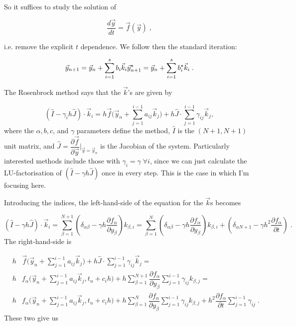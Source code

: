 \documentclass[11pt,a4paper]{article}
\begin{document}
	
	So it suffices to study the solution of
	
	$$
	\dfrac{d\vec{y}}{dt}=\vec{f}(\vec{y}) \;,
	$$
	
	i.e. remove the explicit $t$ dependence. We follow then the standard iteration:
	
	$$
	\vec{y}_{n+1}=\vec{y}_{n}+ \sum_{i=1}^{s} b_i \vec{k}_i \\
	\vec{y}^{\star}_{n+1}=\vec{y}_{n}+ \sum_{i=1}^{s} b_i^{\star} \vec{k}_i \;.
	$$
	
	The Rosenbrock method says that the $\vec{k}$'s are given by
	
	$$
	\left(\hat I - \gamma_i h \hat J \right)\cdot \vec{k}_i =  
	h \vec{f}\Big(\vec{y}_n+\sum_{j=1}^{i-1}a_{ij}\vec{k}_{j} \Big)+
	h \hat J \cdot \sum_{j=1}^{i-1}\gamma_{ij}\vec{k}_{j},
	$$
	where the  $\alpha, b, c$, and $\gamma$ parameters define the method, $\hat I$ is the $(N+1,N+1)$ unit matrix,
	and $\hat J =\dfrac{\partial \vec{f}}{\partial \vec{y}}\Bigg|_{\vec{y}=\vec{y}_n} $ is the Jacobian of the system.
	Particularly interested methods include those with $\gamma_i=\gamma \; \forall i$, since we can just calculate the LU-factorisation 
	of $\left(\hat I - \gamma h \hat J \right)$ once in every step. This is the case in which I'm focusing here.
	
	
	Introducing the indices, the left-hand-side of the equation for the $\vec{k}$s becomes
	
	$$
	\left(\hat I - \gamma h \hat J \right)\cdot \vec{k}_i =  
	\sum_{\beta=1}^{N+1}
	\left(\delta_{\alpha \beta} - \gamma h \dfrac{\partial f_{\alpha}}{\partial y_{\beta}}\right)k_{\beta,i}=
	\sum_{\beta=1}^{N}
	\left(\delta_{\alpha \beta} - \gamma h \dfrac{\partial f_{\alpha}}{\partial y_{\beta}}\right)k_{\beta,i}+
	\left(\delta_{\alpha N+1} - \gamma h^2 \dfrac{\partial f_{\alpha}}{\partial t}\right)\;.
	$$
	The right-hand-side is
	
	\begin{eqnarray}
		&h& \vec{f}\Big(\vec{y}_n+\sum_{j=1}^{i-1}a_{ij}\vec{k}_{j} \Big)+
		h \hat J \cdot \sum_{j=1}^{i-1}\gamma_{ij}\vec{k}_{j}=
		\\
		&h& f_{\alpha}\Big(\vec{y}_n+\sum_{j=1}^{i-1}a_{ij}\vec{k}_{j},t_n + c_{i}h \Big)+
		h \sum_{\beta=1}^{N+1}  \dfrac{\partial f_{\alpha}}{\partial y_{\beta}} \sum_{j=1}^{i-1}\gamma_{ij} k_{\beta,j}=\nonumber\\ 
		&h& f_{\alpha}\Big(\vec{y}_n+\sum_{j=1}^{i-1}a_{ij}\vec{k}_{j}, t_n + c_{i}h\Big)+
		h \sum_{\beta=1}^{N}  \dfrac{\partial f_{\alpha}}{\partial y_{\beta}} \sum_{j=1}^{i-1}\gamma_{ij} k_{\beta,j}+
		h^2\dfrac{\partial f_{\alpha}}{\partial t} \sum_{j=1}^{i-1}\gamma_{ij}\;.  \nonumber
	\end{eqnarray}
	These two give us 
	
\end{document}

